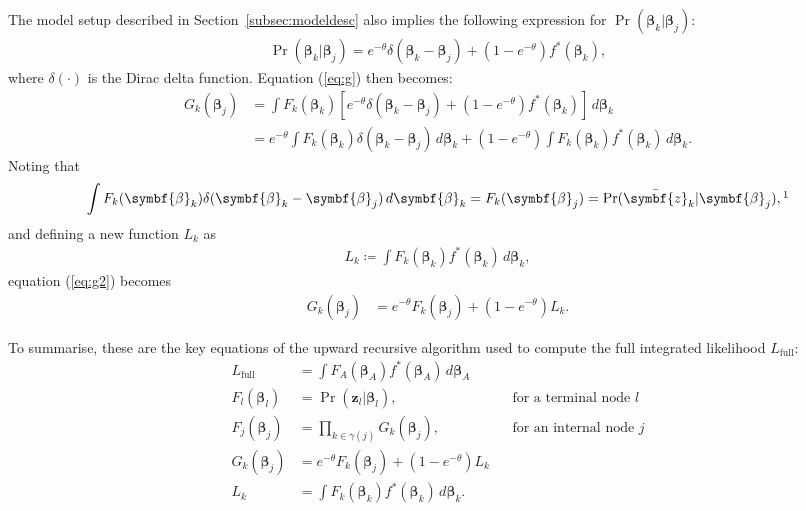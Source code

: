 \documentclass[10pt]{article}
\newcommand{\B}{\symbf{\beta}}
\newcommand{\bz}{\bar{\symbf{z}}}
\begin{document}
The model setup described in Section~\ref{subsec:modeldesc} also implies the following expression for $\Pr(\B_k | \B_j)$:
\begin{align*}
  \Pr(\B_k | \B_j) = e^{-\theta} \delta(\B_k - \B_j) + (1-e^{-\theta})f^*(\B_k),
\end{align*}
where $\delta(\cdot)$ is the Dirac delta function. Equation (\ref{eq:g}) then becomes:
\begin{align}
  G_k(\B_j) &= \int F_k(\B_k) \left[ e^{-\theta} \delta(\B_k - \B_j) + (1-e^{-\theta})f^*(\B_k) \right]  \,d\B_k \nonumber\\
            &= e^{-\theta} \int F_k(\B_k) \delta(\B_k - \B_j) \,d\B_k +
              (1-e^{-\theta}) \int F_k(\B_k) f^*(\B_k) \,d\B_k. \label{eq:g2}
\end{align}
Noting that
\begin{align*}
  \int F_k(\B_k) \delta(\B_k - \B_j) \,d\B_k = F_k(\B_j)= \Pr(\bz_k | \B_j),\footnotemark
\end{align*}
and defining a new function $L_k$ as
\begin{align*}
 L_k \coloneqq \int F_k(\B_k) f^*(\B_k) \,d\B_k,
\end{align*}
equation (\ref{eq:g2}) becomes
\begin{align*}
  G_k(\B_j) &= e^{-\theta} F_k(\B_j) +
              (1-e^{-\theta}) L_k.
\end{align*}


To summarise, these are the key equations of the upward recursive algorithm used to compute the full integrated likelihood $L_\text{full}$:
\begin{align}
  L_\text{full} &= \int F_A(\B_A) f^*(\B_A)  \, d\B_A \label{eq:sum_lfull}\\
  F_l(\B_l) &= \Pr(\symbf{z}_l|\B_l), && \text{for a terminal node $l$} \label{eq:sum_f1}\\  
  F_j(\B_j) &= \prod_{k\in\gamma(j)} G_k(\B_j), && \text{for an internal node $j$} \label{eq:sum_f2}\\
  G_k(\B_j) &= e^{-\theta} F_k(\B_j) + (1-e^{-\theta}) L_k \label{eq:sum_g}\\
  L_k &= \int F_k(\B_k) f^*(\B_k) \,d\B_k. \label{eq:sum_lk}
\end{align}
\end{document}
